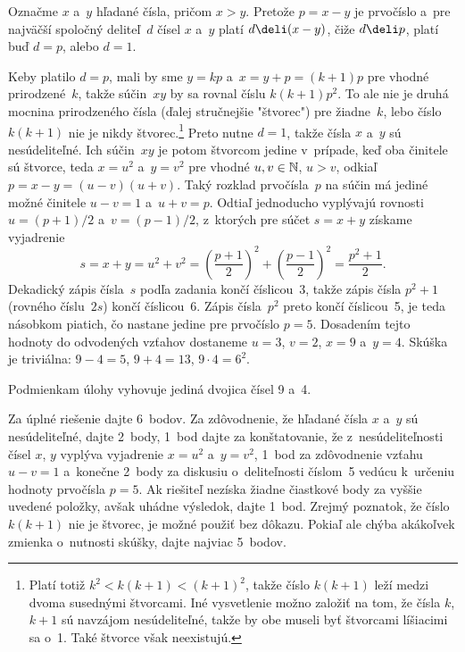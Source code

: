 {%
Označme $x$ a~$y$ hľadané čísla, pričom $x>y$. Pretože $p=x-y$
je prvočíslo a~pre najväčší spoločný deliteľ~$d$ čísel $x$ a~$y$
platí $d\deli (x-y)$, čiže $d\deli p$, platí buď $d=p$, alebo $d=1$.

Keby platilo $d=p$, mali by sme $y=kp$ a~$x=y+p=(k+1)p$ pre
vhodné prirodzené~$k$, takže súčin~$xy$ by sa rovnal číslu
$k(k+1)p^2$. To ale nie je druhá mocnina prirodzeného čísla (ďalej
stručnejšie "štvorec") pre žiadne~$k$, lebo číslo $k(k+1)$ nie je
nikdy štvorec.\footnote{Platí totiž $k^2<k(k+1)<(k+1)^2$, takže
číslo $k(k+1)$ leží medzi dvoma susednými štvorcami. Iné
vysvetlenie možno založiť na tom, že čísla $k$, $k+1$ sú navzájom
nesúdeliteľné, takže by obe museli byť štvorcami líšiacimi sa o~1.
Také štvorce však neexistujú.} Preto nutne $d=1$, takže
čísla $x$ a~$y$ sú nesúdeliteľné. Ich súčin~$xy$ je potom
štvorcom jedine v~prípade, keď oba činitele sú štvorce, teda
$x=u^2$ a~$y=v^2$ pre vhodné $u,v\in\Bbb N$, $u>v$, odkiaľ
$p=x-y=(u-v)(u+v)$. Taký rozklad prvočísla~$p$ na súčin má
jediné možné činitele $u-v=1$ a~$u+v=p$. Odtiaľ jednoducho vyplývajú
rovnosti $u=(p+1)/2$ a~$v=(p-1)/2$, z~ktorých pre
súčet $s=x+y$ získame vyjadrenie
$$
s=x+y=u^2+v^2=
\left(\frac{p+1}{2}\right)^{\!2}+\left(\frac{p-1}{2}\right)^{\!2}=
\frac{p^2+1}{2}.
$$
Dekadický zápis čísla~$s$ podľa zadania končí číslicou~3, takže
zápis čísla $p^2+1$ (rovného číslu~$2s$) končí číslicou~6. Zápis
čísla~$p^2$ preto končí číslicou~5, je teda násobkom piatich, čo
nastane jedine pre prvočíslo $p=5$. Dosadením tejto hodnoty do odvodených
vzťahov dostaneme $u=3$, $v=2$, $x=9$ a~$y=4$.
Skúška je triviálna: $9-4=5$, $9+4=13$, $9\cdot4=6^2$.

\odpoved
Podmienkam úlohy vyhovuje jediná dvojica čísel 9
a~4.


\nobreak\medskip\petit\noindent
Za úplné riešenie dajte 6~bodov. Za zdôvodnenie, že hľadané čísla
$x$ a~$y$ sú nesúdeliteľné, dajte 2~body, 1~bod dajte za
konštatovanie, že z~nesúdeliteľnosti čísel $x$, $y$ vyplýva vyjadrenie
$x=u^2$ a~$y=v^2$, 1~bod za zdôvodnenie vzťahu $u-v=1$ a~konečne
2~body za diskusiu o~deliteľnosti číslom~5 vedúcu k~určeniu
hodnoty prvočísla $p=5$. Ak riešiteľ nezíska žiadne čiastkové body za
vyššie uvedené položky, avšak uhádne výsledok, dajte 1~bod. Zrejmý
poznatok, že číslo $k(k+1)$ nie je štvorec, je možné použiť bez
dôkazu. Pokiaľ ale chýba akákoľvek zmienka o~nutnosti skúšky,
dajte najviac 5~bodov.

\endpetit}

